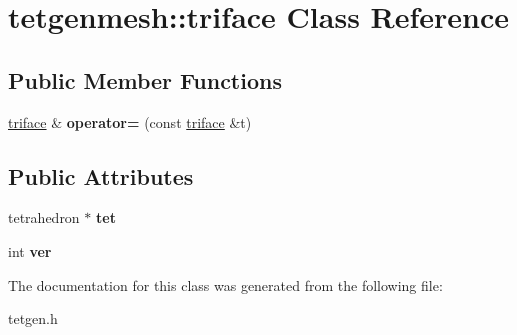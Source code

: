 \hypertarget{classtetgenmesh_1_1triface}{}\section{tetgenmesh\+:\+:triface Class Reference}
\label{classtetgenmesh_1_1triface}
\subsection*{Public Member Functions}
\begin{DoxyCompactItemize}
\item 
\mbox{\label{classtetgenmesh_1_1triface_aeb0b1b77a12ca18599472e01ae8fe119}} 
\hyperlink{classtetgenmesh_1_1triface}{triface} \& {\bfseries operator=} (const \hyperlink{classtetgenmesh_1_1triface}{triface} \&t)
\end{DoxyCompactItemize}
\subsection*{Public Attributes}
\begin{DoxyCompactItemize}
\item 
\mbox{\label{classtetgenmesh_1_1triface_ad3b174c4040b18a5286ddfeb8db02529}} 
tetrahedron $\ast$ {\bfseries tet}
\item 
\mbox{\label{classtetgenmesh_1_1triface_a2b2b1dc34da73125359d6db535d75f7c}} 
int {\bfseries ver}
\end{DoxyCompactItemize}


The documentation for this class was generated from the following file\+:\begin{DoxyCompactItemize}
\item 
tetgen.\+h\end{DoxyCompactItemize}
